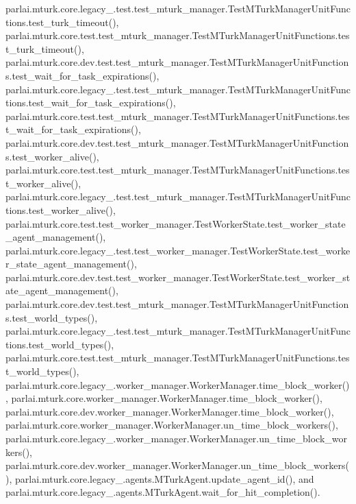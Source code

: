 parlai.\+mturk.\+core.\+legacy\+\_.\+test.\+test\+\_\+mturk\+\_\+manager.\+Test\+M\+Turk\+Manager\+Unit\+Functions.\+test\+\_\+turk\+\_\+timeout(), parlai.\+mturk.\+core.\+test.\+test\+\_\+mturk\+\_\+manager.\+Test\+M\+Turk\+Manager\+Unit\+Functions.\+test\+\_\+turk\+\_\+timeout(), parlai.\+mturk.\+core.\+dev.\+test.\+test\+\_\+mturk\+\_\+manager.\+Test\+M\+Turk\+Manager\+Unit\+Functions.\+test\+\_\+wait\+\_\+for\+\_\+task\+\_\+expirations(), parlai.\+mturk.\+core.\+legacy\+\_.\+test.\+test\+\_\+mturk\+\_\+manager.\+Test\+M\+Turk\+Manager\+Unit\+Functions.\+test\+\_\+wait\+\_\+for\+\_\+task\+\_\+expirations(), parlai.\+mturk.\+core.\+test.\+test\+\_\+mturk\+\_\+manager.\+Test\+M\+Turk\+Manager\+Unit\+Functions.\+test\+\_\+wait\+\_\+for\+\_\+task\+\_\+expirations(), parlai.\+mturk.\+core.\+dev.\+test.\+test\+\_\+mturk\+\_\+manager.\+Test\+M\+Turk\+Manager\+Unit\+Functions.\+test\+\_\+worker\+\_\+alive(), parlai.\+mturk.\+core.\+test.\+test\+\_\+mturk\+\_\+manager.\+Test\+M\+Turk\+Manager\+Unit\+Functions.\+test\+\_\+worker\+\_\+alive(), parlai.\+mturk.\+core.\+legacy\+\_.\+test.\+test\+\_\+mturk\+\_\+manager.\+Test\+M\+Turk\+Manager\+Unit\+Functions.\+test\+\_\+worker\+\_\+alive(), parlai.\+mturk.\+core.\+test.\+test\+\_\+worker\+\_\+manager.\+Test\+Worker\+State.\+test\+\_\+worker\+\_\+state\+\_\+agent\+\_\+management(), parlai.\+mturk.\+core.\+legacy\+\_.\+test.\+test\+\_\+worker\+\_\+manager.\+Test\+Worker\+State.\+test\+\_\+worker\+\_\+state\+\_\+agent\+\_\+management(), parlai.\+mturk.\+core.\+dev.\+test.\+test\+\_\+worker\+\_\+manager.\+Test\+Worker\+State.\+test\+\_\+worker\+\_\+state\+\_\+agent\+\_\+management(), parlai.\+mturk.\+core.\+dev.\+test.\+test\+\_\+mturk\+\_\+manager.\+Test\+M\+Turk\+Manager\+Unit\+Functions.\+test\+\_\+world\+\_\+types(), parlai.\+mturk.\+core.\+legacy\+\_.\+test.\+test\+\_\+mturk\+\_\+manager.\+Test\+M\+Turk\+Manager\+Unit\+Functions.\+test\+\_\+world\+\_\+types(), parlai.\+mturk.\+core.\+test.\+test\+\_\+mturk\+\_\+manager.\+Test\+M\+Turk\+Manager\+Unit\+Functions.\+test\+\_\+world\+\_\+types(), parlai.\+mturk.\+core.\+legacy\+\_.\+worker\+\_\+manager.\+Worker\+Manager.\+time\+\_\+block\+\_\+worker(), parlai.\+mturk.\+core.\+worker\+\_\+manager.\+Worker\+Manager.\+time\+\_\+block\+\_\+worker(), parlai.\+mturk.\+core.\+dev.\+worker\+\_\+manager.\+Worker\+Manager.\+time\+\_\+block\+\_\+worker(), parlai.\+mturk.\+core.\+worker\+\_\+manager.\+Worker\+Manager.\+un\+\_\+time\+\_\+block\+\_\+workers(), parlai.\+mturk.\+core.\+legacy\+\_.\+worker\+\_\+manager.\+Worker\+Manager.\+un\+\_\+time\+\_\+block\+\_\+workers(), parlai.\+mturk.\+core.\+dev.\+worker\+\_\+manager.\+Worker\+Manager.\+un\+\_\+time\+\_\+block\+\_\+workers(), parlai.\+mturk.\+core.\+legacy\+\_.\+agents.\+M\+Turk\+Agent.\+update\+\_\+agent\+\_\+id(), and parlai.\+mturk.\+core.\+legacy\+\_.\+agents.\+M\+Turk\+Agent.\+wait\+\_\+for\+\_\+hit\+\_\+completion().

